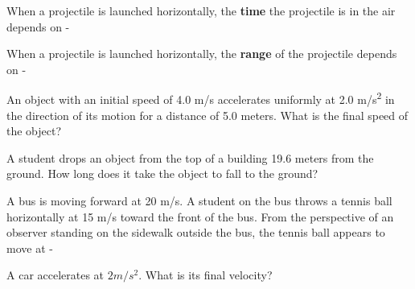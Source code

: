 \documentclass[10pt]{examdesign}
\begin{document}
\begin{multiplechoice} [title={Multiple Choice},
	rearrange=yes]
\begin{question}
\end{question}


\begin{question}
When a projectile is launched horizontally, the \textbf{time} the projectile is in the air depends on - 
\end{question}


\begin{question}
When a projectile is launched horizontally, the \textbf{range} of the projectile depends on - 
\end{question}





\begin{question}
An object with an initial speed of 4.0 m/s accelerates uniformly at 2.0 m/s\textsuperscript{2} in the direction of its motion for a distance of 5.0 meters. What is the
final speed of the object? 
	\end{question}

\begin{question}
A student drops an object from the top of a building 19.6 meters from the ground. How long does it take the object to fall to the ground? 
\end{question}

\begin{question}
A bus is moving forward at 20 m/s.  A student on the bus throws a tennis ball horizontally at 15 m/s toward the front of the bus.  From the perspective of an observer standing on the sidewalk outside the bus, the tennis ball appears to move at - 
	\end{question}

\begin{question}
	A car accelerates at $2 m/s^2$.  What is its final velocity?
\end{question}


\end{multiplechoice}
\end{document}
